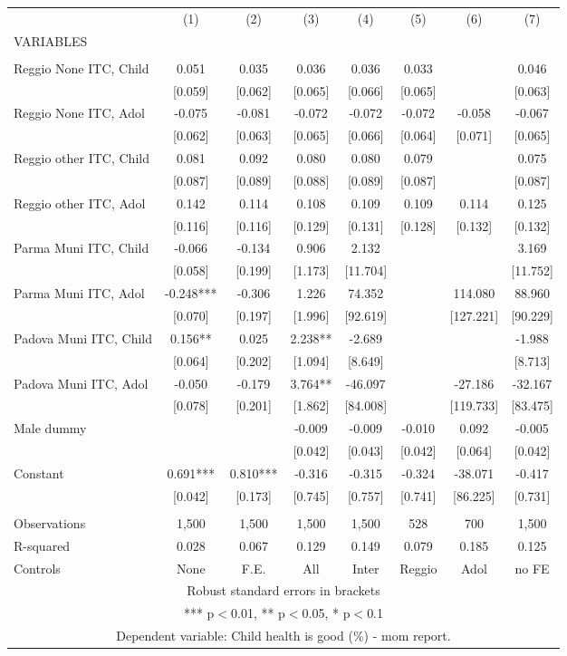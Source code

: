 \begin{tabular}{lccccccc} \hline
 & (1) & (2) & (3) & (4) & (5) & (6) & (7) \\
VARIABLES &  &  &  &  &  &  &  \\ \hline
 &  &  &  &  &  &  &  \\
Reggio None ITC, Child & 0.051 & 0.035 & 0.036 & 0.036 & 0.033 &  & 0.046 \\
 & [0.059] & [0.062] & [0.065] & [0.066] & [0.065] &  & [0.063] \\
Reggio None ITC, Adol & -0.075 & -0.081 & -0.072 & -0.072 & -0.072 & -0.058 & -0.067 \\
 & [0.062] & [0.063] & [0.065] & [0.066] & [0.064] & [0.071] & [0.065] \\
Reggio other ITC, Child & 0.081 & 0.092 & 0.080 & 0.080 & 0.079 &  & 0.075 \\
 & [0.087] & [0.089] & [0.088] & [0.089] & [0.087] &  & [0.087] \\
Reggio other ITC, Adol & 0.142 & 0.114 & 0.108 & 0.109 & 0.109 & 0.114 & 0.125 \\
 & [0.116] & [0.116] & [0.129] & [0.131] & [0.128] & [0.132] & [0.132] \\
Parma Muni ITC, Child & -0.066 & -0.134 & 0.906 & 2.132 &  &  & 3.169 \\
 & [0.058] & [0.199] & [1.173] & [11.704] &  &  & [11.752] \\
Parma Muni ITC, Adol & -0.248*** & -0.306 & 1.226 & 74.352 &  & 114.080 & 88.960 \\
 & [0.070] & [0.197] & [1.996] & [92.619] &  & [127.221] & [90.229] \\
Padova Muni ITC, Child & 0.156** & 0.025 & 2.238** & -2.689 &  &  & -1.988 \\
 & [0.064] & [0.202] & [1.094] & [8.649] &  &  & [8.713] \\
Padova Muni ITC, Adol & -0.050 & -0.179 & 3.764** & -46.097 &  & -27.186 & -32.167 \\
 & [0.078] & [0.201] & [1.862] & [84.008] &  & [119.733] & [83.475] \\
Male dummy &  &  & -0.009 & -0.009 & -0.010 & 0.092 & -0.005 \\
 &  &  & [0.042] & [0.043] & [0.042] & [0.064] & [0.042] \\
Constant & 0.691*** & 0.810*** & -0.316 & -0.315 & -0.324 & -38.071 & -0.417 \\
 & [0.042] & [0.173] & [0.745] & [0.757] & [0.741] & [86.225] & [0.731] \\
 &  &  &  &  &  &  &  \\
Observations & 1,500 & 1,500 & 1,500 & 1,500 & 528 & 700 & 1,500 \\
R-squared & 0.028 & 0.067 & 0.129 & 0.149 & 0.079 & 0.185 & 0.125 \\
 Controls & None & F.E. & All & Inter & Reggio & Adol & no FE \\ \hline
\multicolumn{8}{c}{ Robust standard errors in brackets} \\
\multicolumn{8}{c}{ *** p$<$0.01, ** p$<$0.05, * p$<$0.1} \\
\multicolumn{8}{c}{ Dependent variable: Child health is good (\%) - mom report.} \\
\end{tabular}
